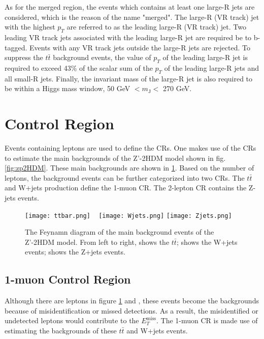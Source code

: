 \documentclass[class=NCU_thesis, crop=false]{standalone}
\begin{document}
	As for the merged region, the events which contains at least one large-R jets are considered, which is the reason of the name "merged". The large-R (VR track) jet with the highest $p_T$ are referred to as the leading large-R (VR track) jet. Two leading VR track jets associated with the leading large-R jet are required be to b-tagged. Events with any VR track jets outside the large-R jets are rejected. To suppress the $t\bar{t}$ background events, the value of $p_T$ of the leading large-R jet is required to exceed 43\% of the scalar sum of the $p_T$ of the leading large-R jets and all small-R jets. Finally, the invariant mass of the large-R jet is also required to be within a Higgs mass window, 50 GeV $< m_{\mathrm{J}} <$ 270 GeV.
	
\section{Control Region}
	Events containing leptons are used to define the CRs. One makes use of the CRs to estimate the main backgrounds of the Z'-2HDM model shown in fig. \ref{fig:zp2HDM}. These main backgrounds are shown in \ref{fig:background}. Based on the number of leptons, the background events can be further categorized into two CRs. The $t\bar{t}$ and W+jets production define the 1-muon CR. The 2-lepton CR contains the Z-jets events.
	
	\begin{figure}[!hbt]
		\centering
		\subcaptionbox
		{\label{fig:subfig_ttbar}}
		{\texttt{[image: ttbar.png]}}
		~
		\subcaptionbox
		{\label{fig:subfig_Wjets}}
		{\texttt{[image: Wjets.png]}}
		\subcaptionbox
		{\label{fig:subfig_Zjets}}
		{\texttt{[image: Zjets.png]}}
		\caption{The Feynamn diagram of the main background events of the Z'-2HDM model. From left to right,  shows the $t\bar{t}$;  shows the W+jets events;  shows the Z+jets events.}
		\label{fig:background}
	\end{figure}

	\subsection{1-muon Control Region}
		Although there are leptons in figure \ref{fig:background}  and , these events become the backgrounds because of misidentification or missed detections. As a result, the misidentified or undetected leptons would contribute to the $E_T^{\mathrm{miss}}$. The 1-muon CR is made use of estimating the backgrounds of these $t\bar{t}$ and W+jets events.
	
\end{document}
